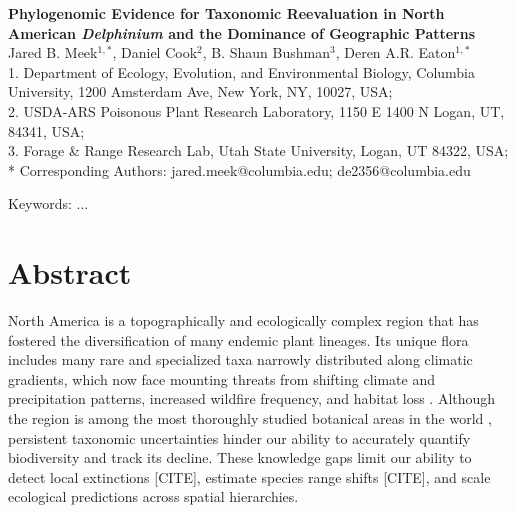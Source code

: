 \documentclass[11pt]{article}
\begin{document}
\begin{center}
	{\bf \Large
	Phylogenomic Evidence for Taxonomic Reevaluation in North American
	\textit{Delphinium} and the Dominance of Geographic Patterns}\\[0.5cm]

Jared B. Meek$^{1,*}$, Daniel Cook$^2$, B. Shaun Bushman$^3$, Deren A.R. Eaton$^{1,*}$\\[0.5cm]

1. Department of Ecology, Evolution, and Environmental Biology, Columbia University, 1200 Amsterdam Ave, New York, NY, 10027, USA;\\
2. USDA-ARS Poisonous Plant Research Laboratory, 1150 E 1400 N Logan, UT, 84341, USA;\\ 3. Forage \& Range Research Lab, Utah State University, Logan, UT 84322, USA;\\ 
* Corresponding Authors: jared.meek@columbia.edu; de2356@columbia.edu

\end{center}

Keywords: ...

\RaggedRight

\section*{Abstract}
North America is a topographically and ecologically complex region that has fostered the 
diversification of many endemic plant lineages. Its unique flora includes many rare and
specialized taxa narrowly distributed along climatic gradients, which now face mounting
threats from shifting climate and precipitation patterns, increased wildfire frequency, and habitat loss
\citep{kannenberg_rapid_2021,overpeck_climate_2020}.
% 
Although the region is among the most thoroughly studied botanical areas in the world
\citep{hickman1993jepson}, persistent taxonomic uncertainties hinder our ability to
accurately quantify biodiversity and track its decline. 
These knowledge gaps limit our ability to detect local extinctions [CITE], 
estimate species range shifts [CITE], and scale ecological predictions across spatial hierarchies. 
\end{document}
